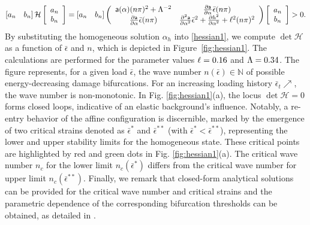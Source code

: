 \documentclass[10pt]{article}
\begin{document}
\begin{align}\left[ a_n \quad b_n \right] \mathcal{H} \left[ \begin{array}{c} a_n \\ b_n \end{array} \right]=\left[ a_n \quad b_n \right]\left(
\begin{array}{cc}
\mathsf{a}(\alpha)(n\pi)^2+\Lambda^{-2}  & \frac{\partial \mathsf{a}}{\partial \alpha}\bar\epsilon(n\pi)  \\
\frac{\partial \mathsf{a}}{\partial \alpha}\bar\epsilon(n\pi)  &   \frac{\partial^2 \mathsf{a}}{\partial \alpha^2}\bar\epsilon^2+ \frac{\partial h^2}{\partial \alpha^2}+\ell^2(n\pi)^2  \\
\end{array}
\right)\left[ \begin{array}{c} a_n \\ b_n \end{array} \right]>0.\label{hessian1}\end{align}
%
By substituting the homogeneous solution $\alpha_h$ into \eqref{hessian1}, we compute $\det \mathcal{H}$ as a function of $\bar \epsilon$ and $n$, which is depicted in Figure~\ref{fig:hessian1}. The calculations are performed for the parameter values $\ell=0.16$ and $\Lambda=0.34$.
The figure represents, for a given load $\bar \epsilon$, the wave number $n(\bar \epsilon)\in \mathbb N$ of possible energy-decreasing damage bifurcations. For an increasing loading history $\bar \epsilon_t\nearrow$, the wave number is non-monotonic.
In Fig. \ref{fig:hessian1}(a), the locus $\det \mathcal H=0$ forms closed loops, indicative of an elastic background's influence. Notably, a re-entry behavior of the affine configuration is discernible, marked by the emergence of two critical strains denoted as $\bar\epsilon^*$ and $\bar\epsilon^{**}$ (with $\bar\epsilon^* < \bar\epsilon^{**}$), representing the lower and upper stability limits for the homogeneous state. These critical points are highlighted by red and green dots in Fig. \ref{fig:hessian1}(a). The critical wave number $n_c$ for the lower limit $n_c(\bar{\epsilon}^*)$    differs from the critical wave number for  upper limit $n_c(\bar{\epsilon}^{**})$. Finally, we remark that closed-form analytical solutions can be provided for the critical wave number and critical strains and the parametric dependence of the corresponding bifurcation thresholds can be obtained, as detailed in \cite{Salman2021-mn}.
\end{document}
